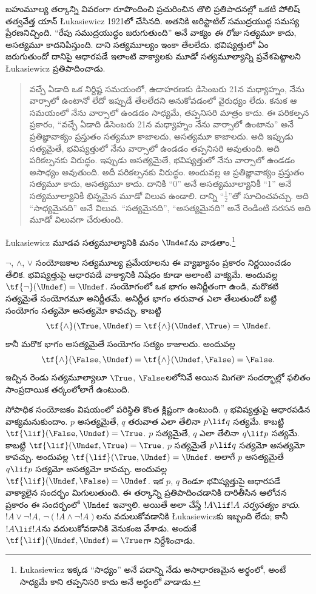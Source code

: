 \documentclass[../../../include/open-logic-section]{subfiles}
\begin{document}


బహుమూల్య తర్కాన్ని వివరంగా రూపొందించి ప్రచురించిన తొలి
ప్రతిపాదనల్లో ఒకటి పోలిష్ తత్వవేత్త యాన్‌ \L ukasiewicz
1921లో చేసినది. అతనికి అరిస్టాటిల్ సముద్రయుద్ధ సమస్య
ప్రేరణనిచ్చింది. “రేపు సముద్రయుద్ధం జరుగుతుంది” అనే వాక్యం
\emph{ఈ రోజు} సత్యమూ కాదు, అసత్యమూ కాదనిపిస్తుంది. దాని
సత్యమూల్యం ఇంకా తేలలేదు. భవిష్యత్తులో ఏం జరుగుతుందో
దానిపై ఆధారపడే ఇలాంటి వాక్యాలకు మూడో సత్యమూల్యాన్ని ప్రవేశపెట్టాలని
\L ukasiewicz ప్రతిపాదించాడు.
\begin{quote}
వచ్చే ఏడాది ఒక నిర్దిష్ట సమయంలో, ఉదాహరణకు డిసెంబరు
21న మధ్యాహ్నం, నేను వార్సాలో ఉంటానో లేదో ఇప్పుడే
తేలలేదని అనుకోవడంలో వైరుధ్యం లేదు. కనుక ఆ సమయంలో
నేను వార్సాలో ఉండడం సాధ్యమే, తప్పనిసరి మాత్రం కాదు.
ఈ పరికల్పన ప్రకారం, “వచ్చే ఏడాది డిసెంబరు 21న మధ్యాహ్నం
నేను వార్సాలో ఉంటాను” అనే ప్రతిజ్ఞావాక్యం ప్రస్తుతం సత్యమూ
కాజాలదు, అసత్యమూ కాజాలదు. అది ఇప్పుడు సత్యమైతే,
భవిష్యత్తులో నేను వార్సాలో ఉండడం తప్పనిసరి అవుతుంది.
అది పరికల్పనకు విరుద్ధం. ఇప్పుడు అసత్యమైతే,
భవిష్యత్తులో నేను వార్సాలో ఉండడం అసాధ్యం అవుతుంది.
అదీ పరికల్పనకు విరుద్ధం. అందువల్ల ఆ ప్రతిజ్ఞావాక్యం
ప్రస్తుతం సత్యమూ కాదు, అసత్యమూ కాదు. దానికి “0” అనే
అసత్యమూల్యానికీ “1” అనే సత్యమూల్యానికీ భిన్నమైన మూడో
విలువ ఉండాలి. దాన్ని “$\frac{1}{2}$”తో సూచించవచ్చు.
అది “సాధ్యమైనది” అనే విలువ. “సత్యమైనది”, “అసత్యమైనది”
అనే రెండింటి సరసన అది మూడో విలువగా చేరుతుంది.
\end{quote}
\L ukasiewicz మూడవ సత్యమూల్యానికి మనం $\Undef$ను
వాడతాం.\footnote{\L ukasiewicz ఇక్కడ “సాధ్యం” అనే పదాన్ని
నేడు అసాధారణమైన అర్థంలో, అంటే సాధ్యమే కాని తప్పనిసరి
కాదు అనే అర్థంలో వాడాడు.}

$\lnot$, $\land$, $\lor$ సంయోజకాల సత్యమూల్య ప్రమేయాలను
ఈ వ్యాఖ్యానం ప్రకారం నిర్ణయించడం తేలిక. భవిష్యత్తుపై
ఆధారపడే వాక్యానికి నిషేధం కూడా అలాంటి వాక్యమే. అందువల్ల
$\tf{\lnot}(\Undef) = \Undef$. సంయోగంలో ఒక భాగం
అనిర్ణీతంగా ఉండి, మరొకటి సత్యమైతే సంయోగమూ అనిర్ణీతమే.
అనిర్ణీత భాగం తరువాత ఎలా తేలుతుందో బట్టి సంయోగం
సత్యమో అసత్యమో కావచ్చు. కాబట్టి \[
    \tf{\land}(\True, \Undef) =
\tf{\land}(\Undef, \True) =
\Undef.
\]
కానీ మరొక భాగం అసత్యమైతే సంయోగం సత్యం కాజాలదు.
అందువల్ల \[\tf{\land}(\False, \Undef) =
\tf{\land}(\Undef, \False) = \False.\]
ఇచ్చిన రెండు సత్యమూల్యాలూ $\True$, $\False$లలోనివే
అయిన మిగతా సందర్భాల్లో ఫలితం సాంప్రదాయిక తర్కంలోలాగే
ఉంటుంది.

సోపాధిక సంయోజకం విషయంలో పరిస్థితి కొంత క్లిష్టంగా ఉంటుంది.
$q$ భవిష్యత్తుపై ఆధారపడిన వాక్యమనుకుందాం.
$p$ అసత్యమైతే, $q$ తరువాత ఎలా తేలినా $p \lif q$
సత్యమే. కాబట్టి $\tf{\lif}(\False, \Undef) = \True$.
$p$ సత్యమైతే, $q$ ఎలా తేలినా $q \lif p$ సత్యమే.
కాబట్టి $\tf{\lif}(\Undef, \True) = \True$.
$p$ సత్యమైతే $p \lif q$ సత్యమో అసత్యమో కావచ్చు.
అందువల్ల $\tf{\lif}(\True, \Undef) = \Undef$.
అలాగే $p$ అసత్యమైతే $q \lif p$ సత్యమో అసత్యమో
కావచ్చు. అందువల్ల $\tf{\lif}(\Undef, \False) = \Undef$.
ఇక $p$, $q$ రెండూ భవిష్యత్తుపై ఆధారపడే వాక్యాలైన
సందర్భం మిగులుతుంది. ఈ తర్కాన్ని ప్రతిపాదించడానికి
దారితీసిన ఆలోచన ప్రకారం ఈ సందర్భంలో $\Undef$ ఇవ్వాలి. అయితే అలా చేస్తే
$!A \lif !A$ \emph{సర్వసత్యం కాదు}. $!A \lor \lnot !A$,
$\lnot(!A \land \lnot !A)$లను వదులుకోవడానికి
\L ukasiewiczకు ఇబ్బంది లేదు; కానీ $!A \lif !A$ను
వదులుకోవడానికి వెనుకంజ వేశాడు. అందుకే
$\tf{\lif}(\Undef, \Undef) = \True$గా నిర్దేశించాడు.
\end{document}
